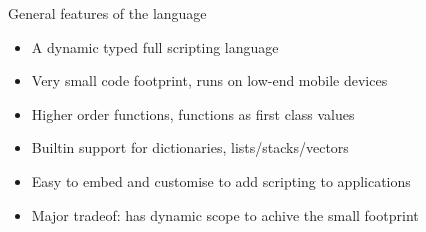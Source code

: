 General features of the language
\begin{itemize}
\item A dynamic typed full scripting language
\item Very small code footprint, runs on low-end mobile devices
\item Higher order functions, functions as first class values
\item Builtin support for dictionaries, lists/stacks/vectors
\item Easy to embed and customise to add scripting to applications
\item Major tradeof: has dynamic scope to achive the small footprint
\end{itemize}
